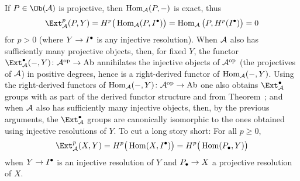 \documentclass[a4paper,parskip=half,numbers=enddot, DIV=12]{scrreprt}
\begin{document}
If $P\in\Ob(\Aa)$ is projective, then $\operatorname{Hom}_{\mathcal{A}}(P,-)$ is exact, thus
\begin{align*}
	\Ext_\Aa^p(P,Y)=H^p\big(\Hom_\Aa(P,I^\bullet)\big)=\Hom_\Aa\big(P,H^p(I^\bullet)\big)=0
\end{align*}
for $p>0$ (where $Y\morphism I^\bullet$ is any injective resolution). When $\mathcal{A}$ also has sufficiently many projective objects, then, for fixed $Y$, the functor $\Ext_\Aa^\bullet(-,Y)\colon \Aa^\op\morphism\cat{Ab}$ annihilates the injective objects of $\mathcal{A}^{\mathrm{op}}$ (the projectives of $\mathcal{A}$) in positive degrees, hence is a right-derived functor of $\operatorname{Hom}_{\mathcal{A}}(-,Y)$. Using the right-derived functors of $\Hom_\Aa(-,Y)\colon \Aa ^\op\morphism\cat{Ab}$ one also obtains $\Ext_\Aa^\bullet$ groups with  as part of the derived functor structure and  from Theorem~; and when $\mathcal{A}$ also has sufficiently many injective objects, then, by the previous arguments, the $\Ext_\Aa^\bullet$ groups are canonically isomorphic to the ones obtained using injective resolutions of $Y$. To cut a long story short: For all $p\geq 0$,
\begin{align*}
	\Ext_\Aa^p(X,Y)=H^p\big(\Hom(X,I^\bullet)\big)=H^p\big(\Hom(P_\bullet,Y)\big)
\end{align*}
when $Y\morphism I^\bullet$ is an injective resolution of $Y$ and $P_\bullet\morphism X$ a projective resolution of $X$.
\end{document}
